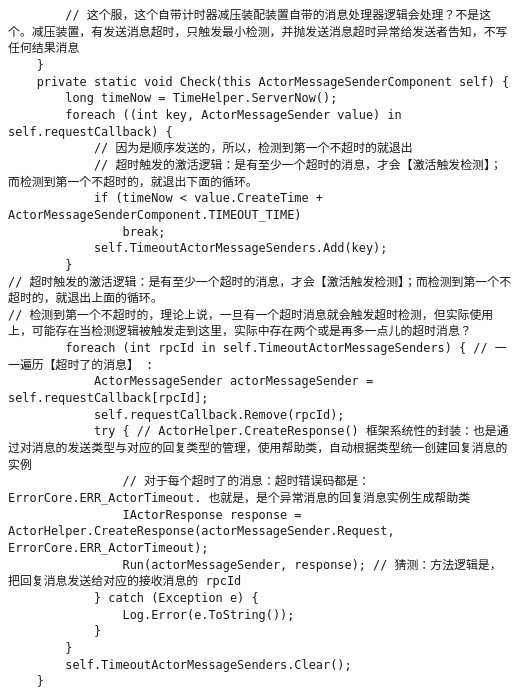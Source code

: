 \documentclass[9pt, b5paper]{article}
\begin{document}
\begin{itemize}
\begin{verbatim}
        // 这个服，这个自带计时器减压装配装置自带的消息处理器逻辑会处理？不是这个。减压装置，有发送消息超时，只触发最小检测，并抛发送消息超时异常给发送者告知，不写任何结果消息 
    }
    private static void Check(this ActorMessageSenderComponent self) {
        long timeNow = TimeHelper.ServerNow();
        foreach ((int key, ActorMessageSender value) in self.requestCallback) {
            // 因为是顺序发送的，所以，检测到第一个不超时的就退出
            // 超时触发的激活逻辑：是有至少一个超时的消息，才会【激活触发检测】；而检测到第一个不超时的，就退出下面的循环。
            if (timeNow < value.CreateTime + ActorMessageSenderComponent.TIMEOUT_TIME) 
                break;
            self.TimeoutActorMessageSenders.Add(key);
        }
// 超时触发的激活逻辑：是有至少一个超时的消息，才会【激活触发检测】；而检测到第一个不超时的，就退出上面的循环。
// 检测到第一个不超时的，理论上说，一旦有一个超时消息就会触发超时检测，但实际使用上，可能存在当检测逻辑被触发走到这里，实际中存在两个或是再多一点儿的超时消息？
        foreach (int rpcId in self.TimeoutActorMessageSenders) { // 一一遍历【超时了的消息】 :
            ActorMessageSender actorMessageSender = self.requestCallback[rpcId];
            self.requestCallback.Remove(rpcId);
            try { // ActorHelper.CreateResponse() 框架系统性的封装：也是通过对消息的发送类型与对应的回复类型的管理，使用帮助类，自动根据类型统一创建回复消息的实例
                // 对于每个超时了的消息：超时错误码都是：ErrorCore.ERR_ActorTimeout. 也就是，是个异常消息的回复消息实例生成帮助类
                IActorResponse response = ActorHelper.CreateResponse(actorMessageSender.Request, ErrorCore.ERR_ActorTimeout);
                Run(actorMessageSender, response); // 猜测：方法逻辑是，把回复消息发送给对应的接收消息的 rpcId
            } catch (Exception e) {
                Log.Error(e.ToString());
            }
        }
        self.TimeoutActorMessageSenders.Clear();
    }


\end{verbatim}
\end{itemize}
\end{document}
